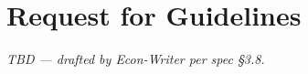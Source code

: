 \section{Request for Guidelines}\label{sec:8}

\textit{TBD --- drafted by Econ-Writer per spec \S3.8.}

